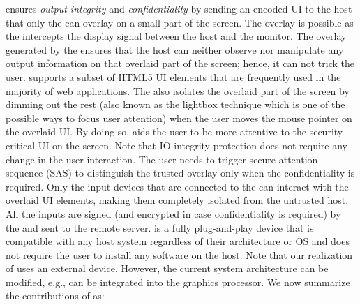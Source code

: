 \name ensures \emph{output integrity} and \emph{confidentiality} by sending an encoded UI to the host that only the \device can overlay on a small part of the screen. The overlay is possible as the \device intercepts the display signal between the host and the monitor. The overlay generated by the \device ensures that the host can neither observe nor manipulate any output information on that overlaid part of the screen; hence, it can not trick the user. \device supports a subset of HTML5 UI elements that are frequently used in the majority of web applications. The \device also isolates the overlaid part of the screen by dimming out the rest (also known as the lightbox technique which is one of the possible ways to focus user attention) when the user moves the mouse pointer on the overlaid UI. By doing so, \name aids the user to be more attentive to the security-critical UI on the screen. Note that \name IO integrity protection does not require any change in the user interaction. The user needs to trigger secure attention sequence (SAS) to distinguish the trusted overlay only when the confidentiality is required. 
Only the input devices that are connected to the \device can interact with the overlaid UI elements, making them completely isolated from the untrusted host. All the inputs are signed (and encrypted in case confidentiality is required) by the \device and sent to the remote server. \device is a fully plug-and-play device that is compatible with any host system regardless of their architecture or OS and does not require the user to install any software on the host. Note that our realization of \name uses an external device. However, the current system architecture can be modified, e.g., \device can be integrated into the graphics processor. We now summarize the contributions of \name as:



